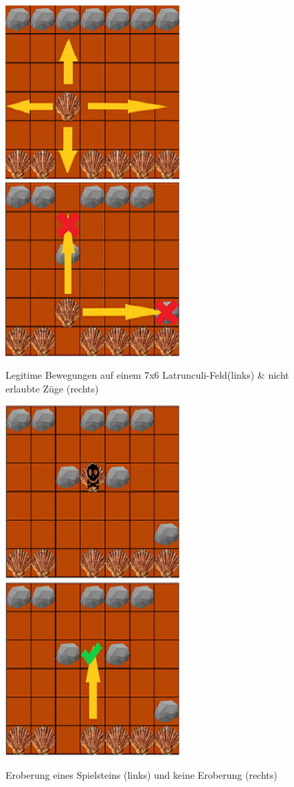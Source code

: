 \begin{figure}[h]
	\centering
	\includegraphics{img/regeln_bewegung222}
	\includegraphics{img/regeln_nottodo22}
	\caption{Legitime Bewegungen auf einem 7x6 Latrunculi-Feld(links) \& nicht erlaubte Züge (rechts)}
	\label{fig:Bewegungen}
\end{figure}
\begin{figure}[h]
	\centering
	\includegraphics{img/regeln_erobern22}
	\includegraphics{img/regeln_nichterobert22}
	\caption{Eroberung eines Spielsteins (links) und keine Eroberung (rechts)}
	\label{fig:erobern}
\end{figure}
